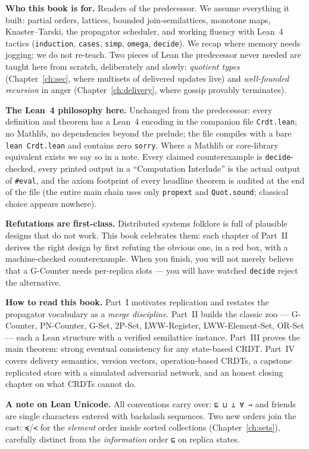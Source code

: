 \documentclass[12pt, a4paper, openright]{book}
\theoremstyle{thmstyle}
\theoremstyle{defstyle}
\newcommand{\lc}[1]{\texttt{#1}}
\begin{document}
\medskip
\textbf{Who this book is for.}
Readers of the predecessor. We assume everything it built: partial orders,
lattices, bounded join-semilattices, monotone maps, Knaster--Tarski, the
propagator scheduler, and working fluency with Lean~4 tactics
(\lc{induction}, \lc{cases}, \lc{simp}, \lc{omega}, \lc{decide}). We recap
where memory needs jogging; we do not re-teach. Two pieces of Lean the
predecessor never needed are taught here from scratch, deliberately and
slowly: \emph{quotient types} (Chapter~\ref{ch:sec}, where multisets of
delivered updates live) and \emph{well-founded recursion} in anger
(Chapter~\ref{ch:delivery}, where gossip provably terminates).

\medskip
\textbf{The Lean~4 philosophy here.}
Unchanged from the predecessor: every definition and theorem has a Lean~4
encoding in the companion file \texttt{Crdt.lean}; no Mathlib, no
dependencies beyond the prelude; the file compiles with a bare
\texttt{lean Crdt.lean} and contains zero \lc{sorry}. Where a Mathlib or
core-library equivalent exists we say so in a note. Every claimed
counterexample is \lc{decide}-checked, every printed output in a
``Computation Interlude'' is the actual output of \texttt{\#eval}, and the
axiom footprint of every headline theorem is audited at the end of the
file (the entire main chain uses only \lc{propext} and \lc{Quot.sound};
classical choice appears nowhere).

\medskip
\textbf{Refutations are first-class.}
Distributed systems folklore is full of plausible designs that do not
work. This book celebrates them: each chapter of Part~II derives the right
design by first refuting the obvious one, in a red box, with a
machine-checked counterexample. When you finish, you will not merely
believe that a G-Counter needs per-replica slots --- you will have watched
\lc{decide} reject the alternative.

\medskip
\textbf{How to read this book.}
Part~I motivates replication and restates the propagator vocabulary as a
\emph{merge discipline}. Part~II builds the classic zoo --- G-Counter,
PN-Counter, G-Set, 2P-Set, LWW-Register, LWW-Element-Set, OR-Set --- each a
Lean structure with a verified semilattice instance. Part~III proves the
main theorem: strong eventual consistency for any state-based CRDT.
Part~IV covers delivery semantics, version vectors, operation-based
CRDTs, a capstone replicated store with a simulated adversarial network,
and an honest closing chapter on what CRDTs cannot do.

\medskip
\textbf{A note on Lean Unicode.}
All conventions carry over: \texttt{⊑ ⊔ ⊥ ∀ →} and friends are single
characters entered with backslash sequences. Two new orders join the cast:
\lc{≼}/\lc{≺} for the \emph{element} order inside sorted collections
(Chapter~\ref{ch:sets}), carefully distinct from the \emph{information}
order \lc{⊑} on replica states.
\end{document}
